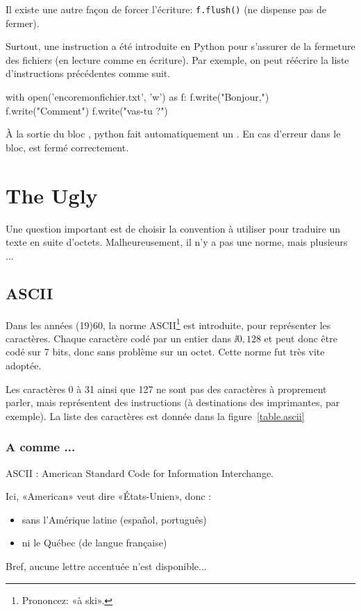 Il existe une autre façon de forcer l'écriture: \verb+f.flush()+ (ne dispense pas de
fermer).

\medskip
Surtout, une instruction  a été introduite en Python pour s'assurer de la
fermeture des fichiers (en lecture comme en écriture). Par exemple, on peut réécrire la liste d'instructions précédentes comme suit. 
\begin{pyverbatim}
with open('encoremonfichier.txt', 'w') as f:
    f.write("Bonjour,\n")
    f.write("Comment")
    f.write("vas-tu ?")
\end{pyverbatim}

\`A la sortie du bloc , python fait automatiquement un . En cas d'erreur dans le bloc,  est fermé correctement.


\section{The Ugly}

Une question important est de choisir la convention à utiliser pour traduire un texte en suite d'octets. Malheureusement, il n'y a pas une norme, mais plusieurs ...

\subsection{ASCII}

Dans les années (19)60, la norme ASCII\footnote{Prononcez: «à ski».} est introduite, pour
représenter les caractères. Chaque caractère codé par un entier dans $\ii{0,128}$ et peut donc être codé sur 7 bits, donc sans problème sur un octet.
Cette norme fut très vite adoptée.

Les caractères 0 à 31 ainsi que 127 ne sont pas des caractères à proprement parler, mais représentent des instructions (à destinations des imprimantes, par exemple).
La liste des caractères est donnée dans la figure~\ref{table.ascii}



\subsubsection{A comme ...}

ASCII : American Standard Code for Information Interchange.

Ici, «American» veut dire «États-Unien», donc :
\begin{itemize}
\item sans l'Amérique latine (espa\~nol, português)
\item ni le Québec (de langue française)
\end{itemize}
Bref, aucune lettre accentuée n'est disponible...

